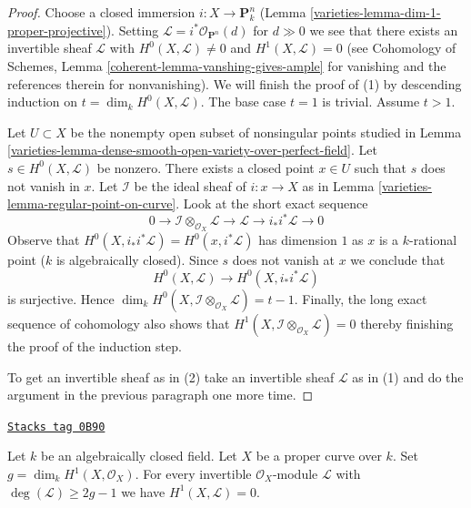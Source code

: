 \begin{proof}

Choose a closed immersion $i : X \to \mathbf{P}^n_k$
(Lemma \ref{varieties-lemma-dim-1-proper-projective}).
Setting $\mathcal{L} = i^*\mathcal{O}_{\mathbf{P}^n}(d)$
for $d \gg 0$ we see that there exists an invertible sheaf
$\mathcal{L}$ with $H^0(X, \mathcal{L}) \not = 0$ and
$H^1(X, \mathcal{L}) = 0$ (see
Cohomology of Schemes, Lemma \ref{coherent-lemma-vanshing-gives-ample}
for vanishing and the references therein for nonvanishing).
We will finish the proof of (1) by descending induction on
$t = \dim_k H^0(X, \mathcal{L})$. The base case $t = 1$ is trivial.
Assume $t > 1$.

\medskip\noindent
Let $U \subset X$ be the nonempty open subset of nonsingular points
studied in Lemma \ref{varieties-lemma-dense-smooth-open-variety-over-perfect-field}.
Let $s \in H^0(X, \mathcal{L})$ be nonzero. There exists a closed
point $x \in U$ such that $s$ does not vanish in $x$. Let $\mathcal{I}$
be the ideal sheaf of $i : x \to X$ as in
Lemma \ref{varieties-lemma-regular-point-on-curve}. Look at the
short exact sequence
$$
0 \to \mathcal{I} \otimes_{\mathcal{O}_X} \mathcal{L} \to
\mathcal{L} \to i_*i^*\mathcal{L} \to 0
$$
Observe that $H^0(X, i_*i^*\mathcal{L}) = H^0(x, i^*\mathcal{L})$
has dimension $1$ as $x$ is a $k$-rational point ($k$ is algebraically
closed). Since $s$ does not vanish at $x$ we conclude that
$$
H^0(X, \mathcal{L}) \longrightarrow H^0(X, i_*i^*\mathcal{L})
$$
is surjective. Hence
$\dim_k H^0(X, \mathcal{I} \otimes_{\mathcal{O}_X} \mathcal{L}) = t - 1$.
Finally, the long exact sequence of cohomology also shows that
$H^1(X, \mathcal{I} \otimes_{\mathcal{O}_X} \mathcal{L}) = 0$
thereby finishing the proof of the induction step.

\medskip\noindent
To get an invertible sheaf as in (2) take an invertible sheaf
$\mathcal{L}$ as in (1) and do the argument in the previous paragraph
one more time.
\end{proof}

\begin{lemma}
\label{varieties-lemma-vanishing-degree-2g-and-1-line-bundle}
\href{https://stacks.math.columbia.edu/tag/0B90}{\texttt{Stacks tag 0B90}}

Let $k$ be an algebraically closed field. Let $X$ be a proper curve over $k$.
Set $g = \dim_k H^1(X, \mathcal{O}_X)$. For every invertible
$\mathcal{O}_X$-module $\mathcal{L}$ with $\deg(\mathcal{L}) \geq 2g - 1$
we have $H^1(X, \mathcal{L}) = 0$.
\end{lemma}

